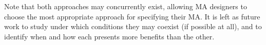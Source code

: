Note that both approaches may concurrently exist, allowing MA designers to choose
the most appropriate approach for specifying their MA. It is left as future work
to study under which conditions they may coexist (if possible at all), and to 
identify when and how each presents more benefits than the other.
